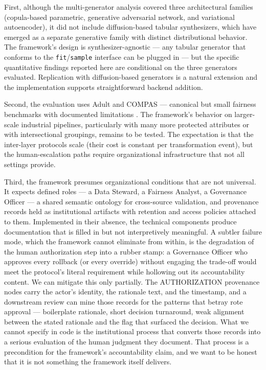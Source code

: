\documentclass[11pt]{article}
\begin{document}
First, although the multi-generator analysis covered three architectural families (copula-based parametric, generative adversarial network, and variational autoencoder), it did not include diffusion-based tabular synthesizers, which have emerged as a separate generative family with distinct distributional behavior. The framework's design is synthesizer-agnostic --- any tabular generator that conforms to the \texttt{fit}/\texttt{sample} interface can be plugged in --- but the specific quantitative findings reported here are conditional on the three generators evaluated. Replication with diffusion-based generators is a natural extension and the implementation supports straightforward backend addition.

Second, the evaluation uses Adult and COMPAS --- canonical but small fairness benchmarks with documented limitations \cite{Bao2021}. The framework's behavior on larger-scale industrial pipelines, particularly with many more protected attributes or with intersectional groupings, remains to be tested. The expectation is that the inter-layer protocols scale (their cost is constant per transformation event), but the human-escalation paths require organizational infrastructure that not all settings provide.

Third, the framework presumes organizational conditions that are not universal. It expects defined roles --- a Data Steward, a Fairness Analyst, a Governance Officer --- a shared semantic ontology for cross-source validation, and provenance records held as institutional artifacts with retention and access policies attached to them. Implemented in their absence, the technical components produce documentation that is filled in but not interpretively meaningful. A subtler failure mode, which the framework cannot eliminate from within, is the degradation of the human authorization step into a rubber stamp: a Governance Officer who approves every rollback (or every override) without engaging the trade-off would meet the protocol's literal requirement while hollowing out its accountability content. We can mitigate this only partially. The AUTHORIZATION provenance nodes carry the actor's identity, the rationale text, and the timestamp, and a downstream review can mine those records for the patterns that betray rote approval --- boilerplate rationale, short decision turnaround, weak alignment between the stated rationale and the flag that surfaced the decision. What we cannot specify in code is the institutional process that converts those records into a serious evaluation of the human judgment they document. That process is a precondition for the framework's accountability claim, and we want to be honest that it is not something the framework itself delivers.
\end{document}
